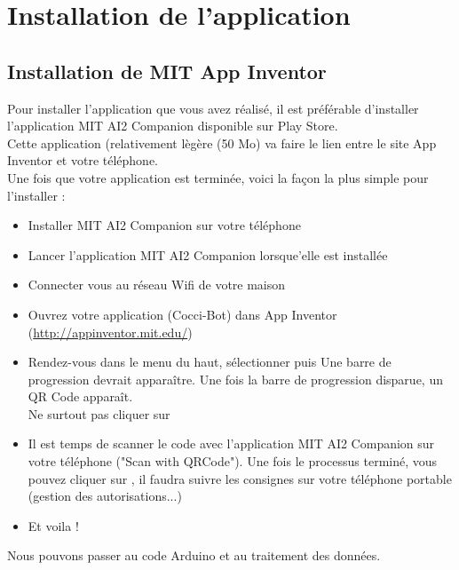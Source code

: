 \chapter{Installation de l'application}

\section{Installation de MIT App Inventor}

Pour installer l'application que vous avez réalisé, il est préférable d'installer l'application MIT AI2 Companion disponible sur Play Store. \\
Cette application (relativement lègère (50 Mo) va faire le lien entre le site App Inventor et votre téléphone. \\
Une fois que votre application est terminée, voici la façon la plus simple pour l'installer : 


\begin{itemize}
    \item Installer MIT AI2 Companion sur votre téléphone 
    \item Lancer l'application MIT AI2 Companion lorsque'elle est installée 
    \item Connecter vous au réseau Wifi de votre maison 
    \item Ouvrez votre application (Cocci-Bot) dans App Inventor (\url{http://appinventor.mit.edu/}) 
    \item Rendez-vous dans le menu du haut, sélectionner  puis 
    Une barre de progression devrait apparaître.
    Une fois la barre de progression disparue, un QR Code apparaît. \\ {\color{red}Ne surtout pas cliquer sur }
    
   \item Il est temps de scanner le code avec l'application MIT AI2 Companion sur votre téléphone ("Scan with QRCode"). Une fois le processus terminé, vous pouvez cliquer sur , il faudra suivre les consignes sur votre téléphone portable (gestion des autorisations...)
   \item Et voila !
    
\end{itemize}

Nous pouvons passer au code Arduino et au traitement des données.
